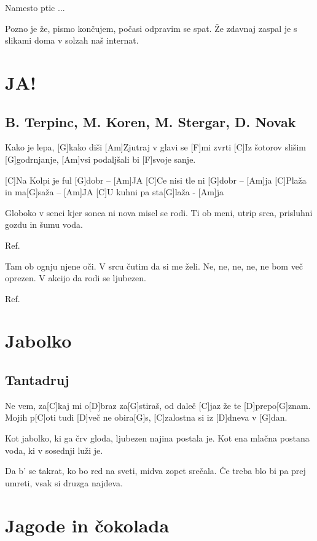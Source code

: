 \documentclass[a4paper,12pt]{article}
\begin{document}
\begin{multicols}{2}
\begin{guitar}
Namesto ptic ...


Pozno je že, pismo končujem,
počasi odpravim se spat.
Že zdavnaj zaspal je s slikami doma
v solzah naš internat.

\end{guitar}
\section{JA!}
\subsection*{B. Terpinc, M. Koren, M. Stergar, D. Novak}
\begin{guitar}
[C]Kako je lepa, [G]kako diši
[Am]Zjutraj v glavi se [F]mi zvrti
[C]Iz šotorov slišim [G]godrnjanje,
[Am]vsi podaljšali bi [F]svoje sanje.


[C]Na Kolpi je ful [G]dobr – [Am]JA
[C]Ce nisi tle ni [G]dobr – [Am]ja
[C]Plaža in ma[G]saža – [Am]JA
[C]U kuhni pa sta[G]laža - [Am]ja


Globoko v senci kjer sonca ni
nova misel se rodi.
Ti ob meni, utrip srca,
prisluhni gozdu in šumu voda.


Ref.


Tam ob ognju njene oči.
V srcu čutim da si me želi.
Ne, ne, ne, ne, ne bom več oprezen.
V akcijo da rodi se ljubezen.


Ref.

\end{guitar}
\section{Jabolko}
\subsection*{Tantadruj}
\begin{guitar}
[G]Ne vem, za[C]kaj mi o[D]braz za[G]stiraš,
od daleč [C]jaz že te [D]prepo[G]znam.
Mojih p[C]oti tudi [D]več ne obira[G]s,
[C]zalostna si iz [D]dneva v [G]dan.


Kot jabolko, ki ga črv gloda,
ljubezen najina postala je.
Kot ena mlačna postana voda,
ki v sosednji luži je.


Da b' se takrat, ko bo red na sveti,
midva zopet srečala.
Če treba blo bi pa prej umreti,
vsak si druzga najdeva.

\end{guitar}
\section{Jagode in čokolada}

\end{multicols}
\end{document}
